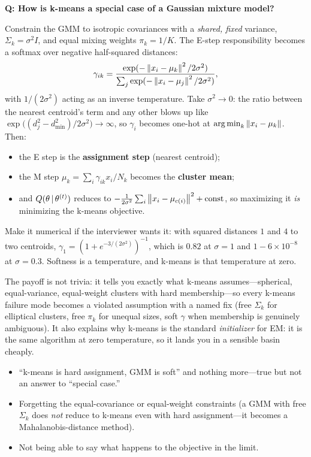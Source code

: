 \begin{interviewq}
\textbf{Q: How is k-means a special case of a Gaussian mixture model?}

 \quad {} \quad \badgefreq{\freqmed}

\stronganswer

Constrain the GMM to isotropic covariances with a \emph{shared, fixed} variance, $\Sigma_k = \sigma^2 I$, and equal mixing weights $\pi_k = 1/K$. The E-step responsibility becomes a softmax over negative half-squared distances:
\begin{equation*}
\gamma_{ik} = \frac{\exp(-\left\lVert x_i-\mu_k\right\rVert^2/2\sigma^2)}{\sum_j \exp(-\left\lVert x_i-\mu_j\right\rVert^2/2\sigma^2)} ,
\end{equation*}
with $1/(2\sigma^2)$ acting as an inverse temperature. Take $\sigma^2 \to 0$: the ratio between the nearest centroid's term and any other blows up like $\exp\big((d_j^2 - d_{\min}^2)/2\sigma^2\big) \to \infty$, so $\gamma_i$ becomes one-hot at $\operatorname*{arg\,min}_k\left\lVert x_i - \mu_k\right\rVert$. Then:
\begin{itemize}
    \item the E step is the \textbf{assignment step} (nearest centroid);
    \item the M step $\mu_k = \sum_i\gamma_{ik}x_i/N_k$ becomes the \textbf{cluster mean};
    \item and $Q(\theta\,|\,\theta^{(t)})$ reduces to $-\frac{1}{2\sigma^2}\sum_i\left\lVert x_i-\mu_{c(i)}\right\rVert^2 + \text{const}$, so maximizing it \emph{is} minimizing the k-means objective.
\end{itemize}
Make it numerical if the interviewer wants it: with squared distances $1$ and $4$ to two centroids, $\gamma_1 = (1+e^{-3/(2\sigma^2)})^{-1}$, which is $0.82$ at $\sigma=1$ and $1 - 6\times10^{-8}$ at $\sigma = 0.3$. Softness is a temperature, and k-means is that temperature at zero.

The payoff is not trivia: it tells you exactly what k-means assumes---spherical, equal-variance, equal-weight clusters with hard membership---so every k-means failure mode becomes a violated assumption with a named fix (free $\Sigma_k$ for elliptical clusters, free $\pi_k$ for unequal sizes, soft $\gamma$ when membership is genuinely ambiguous). It also explains why k-means is the standard \emph{initializer} for EM: it is the same algorithm at zero temperature, so it lands you in a sensible basin cheaply.

\redflags
\begin{itemize}
    \item ``k-means is hard assignment, GMM is soft'' and nothing more---true but not an answer to ``special case.''
    \item Forgetting the equal-covariance or equal-weight constraints (a GMM with free $\Sigma_k$ does \emph{not} reduce to k-means even with hard assignment---it becomes a Mahalanobis-distance method).
    \item Not being able to say what happens to the objective in the limit.
\end{itemize}


\end{interviewq}
